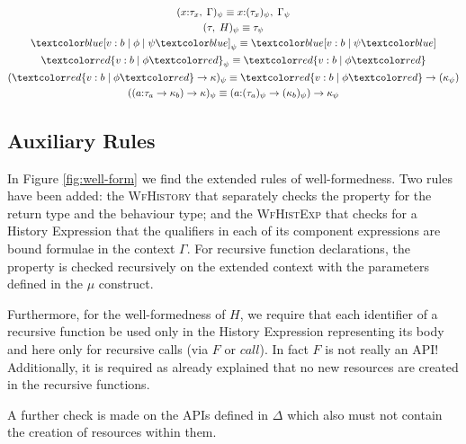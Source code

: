 \begin{definition}
    \begin{equation}
        \begin{gathered}
            (x{:}\tau_x, \;\Gamma)_{\psi} \equiv x{:}(\tau_x)_{\psi}, \;\Gamma_{\psi} \\
            (\tau, \;H)_{\psi} \equiv \tau_{\psi} \\
            \under{v: b \;|\; \phi \;|\; \psi}_{\psi} \equiv \under{v: b \;|\; \psi} \\
            \overa{v: b \;|\; \phi}_{\psi} \equiv \overa{v: b \;|\; \phi} \\
            (\overa{v: b \;|\; \phi} \rightarrow \kappa)_{\psi} \equiv \overa{v: b \;|\; \phi} \rightarrow (\kappa_{\psi}) \\
            ((a{:}\tau_a \rightarrow \kappa_b) \rightarrow \kappa)_{\psi} \equiv (a{:}(\tau_a)_{\psi} \rightarrow (\kappa_b)_{\psi}) \rightarrow \kappa_{\psi} \\
        \end{gathered}
    \end{equation}
\end{definition}

\subsection{Auxiliary Rules}

In Figure \ref{fig:well-form} we find the extended rules of well-formedness. Two rules have been added: the \textsc{WfHistory} that separately checks the property for the return type and the behaviour type; and the \textsc{WfHistExp} that checks for a History Expression that the qualifiers in each of its component expressions are bound formulae in the context $\Gamma$. For recursive function declarations, the property is checked recursively on the extended context with the parameters defined in the $\mu$ construct.

Furthermore, for the well-formedness of $H$, we require that each identifier of a recursive function be used only in the History Expression representing its body and here only for recursive calls (via $F$ or $call$). In fact $F$ is not really an API! Additionally, it is required as already explained that no new resources are created in the recursive functions.

A further check is made on the APIs defined in $\Delta$ which also must not contain the creation of resources within them.

